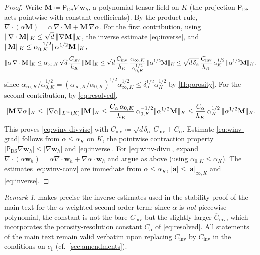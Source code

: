 \documentclass[11pt,a4paper]{article}
\newcommand{\ba}{\boldsymbol{a}}
\newcommand{\ViscProj}{\mathsf{P}_{\mathrm{DS}}}
\newcommand{\Cinv}{C_{\mathrm{inv}}}
\newcommand{\Cinva}{\overline{C}_{\mathrm{inv}}}
\DeclarePairedDelimiter{\norm}{\lVert}{\rVert}
\theoremstyle{plain}
\theoremstyle{remark}
\newtheorem{remark}[lemma]{Remark}
\theoremstyle{definition}
\numberwithin{equation}{section}
\begin{document}
\begin{proof}
Write $\mathbf{M}\coloneqq\ViscProj\nabla\boldsymbol{w}_h$, a polynomial tensor field on
$K$ (the projection $\ViscProj$ acts pointwise with constant coefficients). By the product
rule, $\nabla\cdot(\alpha\mathbf{M})=\alpha\,\nabla\cdot\mathbf{M}
+\mathbf{M}\,\nabla\alpha$. For the first contribution, using
$\norm{\nabla\cdot\mathbf{M}}_K\le\sqrt{d}\,\norm{\nabla\mathbf{M}}_K$, the inverse
estimate \eqref{eq:inverse}, and
$\norm{\mathbf{M}}_K\le\alpha_{0,K}^{-1/2}\norm{\alpha^{1/2}\mathbf{M}}_K$,
\[
  \norm{\alpha\,\nabla\cdot\mathbf{M}}_K
  \le \alpha_{\infty,K}\,\sqrt{d}\,\frac{\Cinv}{h_K}\,\norm{\mathbf{M}}_K
  \le \sqrt{d}\,\frac{\Cinv}{h_K}\,
  \frac{\alpha_{\infty,K}}{\alpha_{0,K}^{1/2}}\,
  \norm{\alpha^{1/2}\mathbf{M}}_K
  \le \sqrt{d\,\delta_\alpha}\,\frac{\Cinv}{h_K}\,\alpha_K^{1/2}\,
  \norm{\alpha^{1/2}\mathbf{M}}_K,
\]
since $\alpha_{\infty,K}/\alpha_{0,K}^{1/2}
=(\alpha_{\infty,K}/\alpha_{0,K})^{1/2}\alpha_{\infty,K}^{1/2}
\le\delta_\alpha^{1/2}\alpha_K^{1/2}$ by \cref{H:porosity}. For the second contribution,
by \eqref{eq:resolved},
\[
  \norm{\mathbf{M}\,\nabla\alpha}_K
  \le \norm{\nabla\alpha}_{L^\infty(K)}\norm{\mathbf{M}}_K
  \le \frac{C_\alpha\,\alpha_{0,K}}{h_K}\,
  \alpha_{0,K}^{-1/2}\norm{\alpha^{1/2}\mathbf{M}}_K
  \le \frac{C_\alpha}{h_K}\,\alpha_K^{1/2}\,
  \norm{\alpha^{1/2}\mathbf{M}}_K .
\]
This proves \eqref{eq:winv-divvisc} with
$\Cinva\coloneqq\sqrt{d\,\delta_\alpha}\,\Cinv+C_\alpha$. Estimate
\eqref{eq:winv-grad} follows from $\alpha\le\alpha_K$ on $K$, the pointwise contraction
property $|\ViscProj\nabla\boldsymbol{w}_h|\le|\nabla\boldsymbol{w}_h|$ and
\eqref{eq:inverse}. For \eqref{eq:winv-divu}, expand
$\nabla\cdot(\alpha\boldsymbol{w}_h)=\alpha\nabla\cdot\boldsymbol{w}_h
+\nabla\alpha\cdot\boldsymbol{w}_h$ and argue as above (using $\alpha_{0,K}\le\alpha_K$).
The estimates \eqref{eq:winv-conv} are immediate from $\alpha\le\alpha_K$,
$|\ba|\le|\ba|_{\infty,K}$ and \eqref{eq:inverse}.
\end{proof}

\begin{remark}\label{rem:winvconst}
 makes precise the inverse estimates used in the stability proof of the
main text for the $\alpha$-weighted second-order term: since $\alpha$ is \emph{not}
piecewise polynomial, the constant is not the bare $\Cinv$ but the slightly larger
$\Cinva$, which incorporates the porosity-resolution constant $C_\alpha$ of
\eqref{eq:resolved}. All statements of the main text remain valid verbatim upon replacing
$\Cinv$ by $\Cinva$ in the conditions on $c_1$ (cf.\ \cref{sec:amendments}).
\end{remark}
\end{document}
